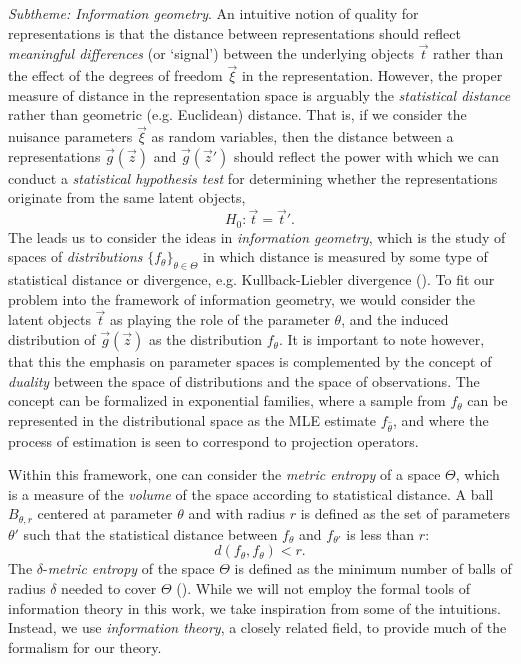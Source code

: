 \emph{Subtheme: Information geometry}.  An intuitive notion of quality
for representations is that the distance between representations
should reflect \emph{meaningful differences} (or `signal') between the
underlying objects $\vec{t}$ rather than the effect of the degrees of
freedom $\vec{\xi}$ in the representation.  However, the proper
measure of distance in the representation space is arguably the
\emph{statistical distance} rather than geometric (e.g. Euclidean)
distance.  That is, if we consider the nuisance parameters $\vec{\xi}$
as random variables, then the distance between a representations
$\vec{g}(\vec{z})$ and $\vec{g}(\vec{z}')$ should reflect the power
with which we can conduct a \emph{statistical hypothesis test} for
determining whether the representations originate from the same latent objects, 
\[
H_0: \vec{t} = \vec{t}'.
\]
The leads us to consider the ideas in \emph{information geometry},
which is the study of spaces of \emph{distributions}
$\{f_\theta\}_{\theta \in \Theta}$ in which distance is measured by
some type of statistical distance or divergence, e.g. Kullback-Liebler
divergence (\cite{amari2007methods}).  To fit our problem into the
framework of information geometry, we would consider the latent
objects $\vec{t}$ as playing the role of the parameter $\theta$, and
the induced distribution of $\vec{g}(\vec{z})$ as the distribution
$f_\theta$.  It is important to note however, that this the emphasis
on parameter spaces is complemented by the concept of \emph{duality}
between the space of distributions and the space of observations.  The
concept can be formalized in exponential families, where a sample from
$f_\theta$ can be represented in the distributional space as the MLE
estimate $f_{\hat{\theta}}$, and where the process of estimation is
seen to correspond to projection operators.

Within this framework, one can consider the \emph{metric
  entropy} of a space $\Theta$, which is a measure of the
\emph{volume} of the space according to statistical distance.  A ball
$B_{\theta, r}$ centered at parameter $\theta$ and with radius $r$ is
defined as the set of parameters $\theta'$ such that the statistical
distance between $f_\theta$ and $f_{\theta'}$ is less than $r$:
\[d(f_{\theta}, f_{\theta}) < r.\]
The $\delta$-\emph{metric entropy} of the space $\Theta$ is defined as
the minimum number of balls of radius $\delta$ needed to cover
$\Theta$ (\cite{adler2009random}).  While we will not employ the
formal tools of information theory in this work, we take inspiration
from some of the intuitions.  Instead, we use \emph{information
  theory}, a closely related field, to provide much of the formalism
for our theory.

